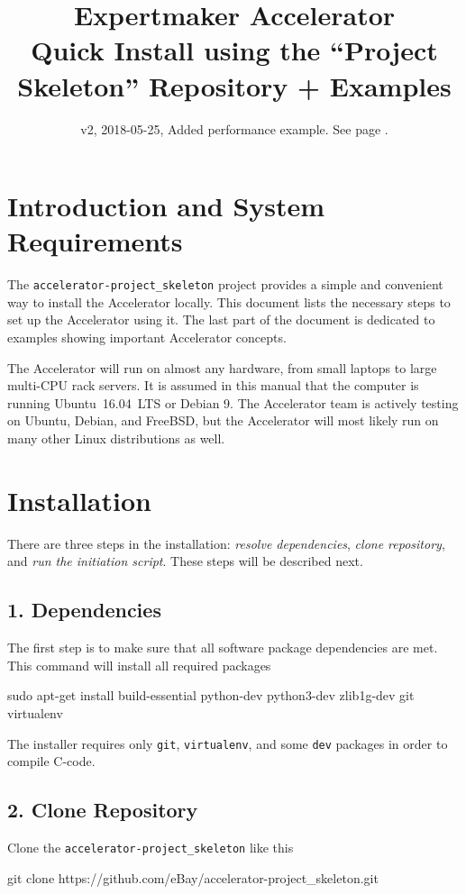 \documentclass[a4paper]{article}
\title{\vspace{-20mm}Expertmaker Accelerator\\[1ex]\Large{Quick Install using the ``Project Skeleton'' Repository + Examples}}
\date{v2, 2018-05-25, Added performance example.  See page \pageref{example:datasetperf}.}
\begin{document}
\maketitle

\section*{Introduction and System Requirements}
The \texttt{accelerator-project\_skeleton} project provides a simple
and convenient way to install the Accelerator locally.  This document
lists the necessary steps to set up the Accelerator using it.  The
last part of the document is dedicated to examples showing important
Accelerator concepts.

The Accelerator will run on almost any hardware, from small laptops to
large multi-CPU rack servers.  It is assumed in this manual that the
computer is running Ubuntu~16.04~LTS or Debian 9.  The Accelerator
team is actively testing on Ubuntu, Debian, and FreeBSD, but the
Accelerator will most likely run on many other Linux distributions as well.


\section*{Installation}
There are three steps in the installation: \textsl{resolve dependencies}, \textsl{clone
repository}, and \textsl{run the initiation script}.  These steps will be
described next.
\subsection*{1. Dependencies}
The first step is to make sure that all software package dependencies
are met.  This command will install all required packages
\begin{shell}
sudo apt-get install build-essential python-dev python3-dev zlib1g-dev git virtualenv
\end{shell}
The installer requires only \texttt{git}, \texttt{virtualenv}, and
some \texttt{dev} packages in order to compile C-code.

\subsection*{2. Clone Repository}
Clone the \texttt{accelerator-project\_skeleton} like this
\begin{shell}
git clone https://github.com/eBay/accelerator-project_skeleton.git
\end{shell}
\end{document}
